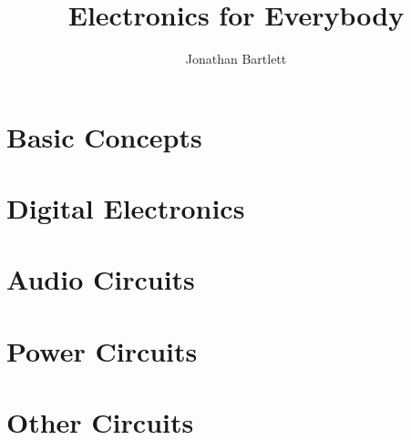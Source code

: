 \documentclass{book}
\begin{document}
\sloppy

\frontmatter

\title{Electronics for Everybody}
\author{Jonathan Bartlett}



\tableofcontents

\mainmatter




\part{Basic Concepts}












\part{Digital Electronics}







\part{Audio Circuits}



\part{Power Circuits}





\part{Other Circuits}

% 

\appendix







\end{document}
